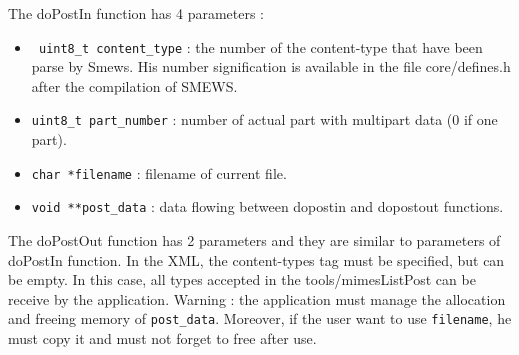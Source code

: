 \documentclass{report}
\begin{document}
The doPostIn function has 4 parameters :
\begin{itemize}
\item \verb+ uint8_t content_type+ : the number of the content-type that have been parse by Smews. His number signification is available in the file core/defines.h after the compilation of SMEWS. 
\item \verb+uint8_t part_number+ : number of actual part with multipart data (0 if one part).
\item \verb+char *filename+ : filename of current file.
\item \verb+void **post_data+ : data flowing between dopostin and dopostout functions.
\end{itemize}

The doPostOut function has 2 parameters and they are similar to parameters of doPostIn function.
In the XML, the content-types tag must be specified, but can be empty. In this case, all types accepted in the tools/mimesListPost can be receive by the application.
\newline
Warning : the application must manage the allocation and freeing memory of {\tt post\_data}. Moreover, if the user want to use {\tt filename}, he must copy it and must not forget to free after use.  
\end{document}

